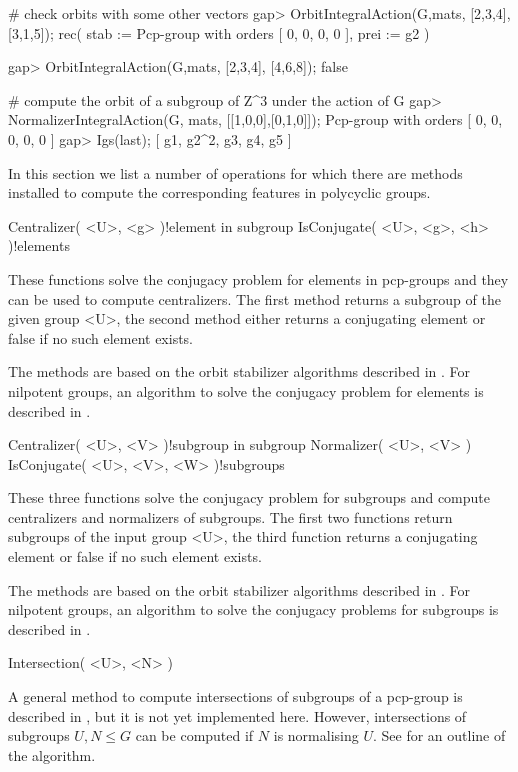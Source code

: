 # check orbits with some other vectors
gap> OrbitIntegralAction(G,mats, [2,3,4],[3,1,5]);
rec( stab := Pcp-group with orders [ 0, 0, 0, 0 ], prei := g2 )

gap> OrbitIntegralAction(G,mats, [2,3,4], [4,6,8]);
false

# compute the orbit of a subgroup of Z^3 under the action of G
gap> NormalizerIntegralAction(G, mats, [[1,0,0],[0,1,0]]);
Pcp-group with orders [ 0, 0, 0, 0, 0 ]
gap> Igs(last);
[ g1, g2^2, g3, g4, g5 ]
\endexample


In this section we list a number of operations for which there are methods
installed to compute the corresponding features in polycyclic groups. 

\> Centralizer( <U>, <g> )!{element in subgroup}
\> IsConjugate( <U>, <g>, <h> )!{elements}

These functions solve the conjugacy problem for elements in pcp-groups and 
they can be used to compute centralizers. The first method returns a 
subgroup of the given group <U>, the second method either returns a 
conjugating element or false if no such element exists.

The methods are based on the orbit stabilizer algorithms described in 
\cite{EOs01}. For nilpotent groups, an algorithm to solve the conjugacy
problem for elements is described in \cite{Sims94}. 

\> Centralizer( <U>, <V> )!{subgroup in subgroup}
\> Normalizer( <U>, <V> )
\> IsConjugate( <U>, <V>, <W> )!{subgroups}

These three functions solve the conjugacy problem for subgroups and compute 
centralizers and normalizers of subgroups. The first two functions return 
subgroups of the input group <U>, the third function returns a conjugating 
element or false if no such element exists.

The methods are based on the orbit stabilizer algorithms described in 
\cite{Eic02}. For nilpotent groups, an algorithm to solve the conjugacy
problems for subgroups is described in \cite{Lo98}.

\> Intersection( <U>, <N> )

A general method to compute intersections of subgroups of a pcp-group is 
described in \cite{Eic01b}, but it is not yet implemented here. However, 
intersections of subgroups $U, N \leq G$ can be computed if $N$ is 
normalising $U$. See \cite{Sims94} for an outline of the algorithm.


